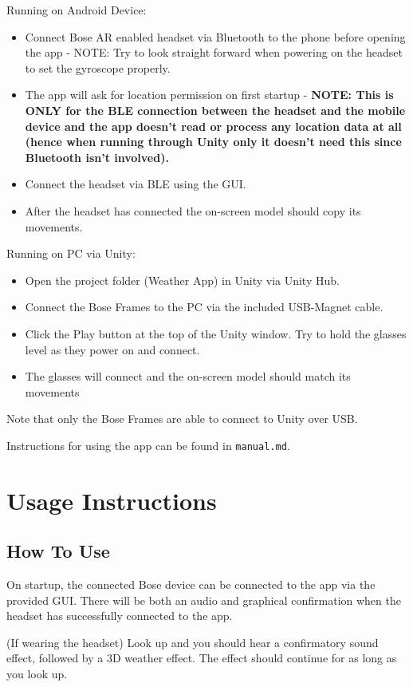 \documentclass{l4proj}
\begin{document}
\begin{appendices}
Running on Android Device: \begin{itemize}
    \item Connect Bose AR enabled headset via Bluetooth to the phone before opening the app - NOTE: Try to look straight forward when powering on the headset to set the gyroscope properly.
    \item The app will ask for location permission on first startup - \textbf{NOTE: This is ONLY for the BLE connection between the headset and the mobile device and the app doesn't read or process any location data at all (hence when running through Unity only it doesn't need this since Bluetooth isn't involved).}
    \item Connect the headset via BLE using the GUI.
    \item After the headset has connected the on-screen model should copy its movements.
\end{itemize}

Running on PC via Unity: \begin{itemize}
    \item Open the project folder (Weather App) in Unity via Unity Hub.
    \item Connect the Bose Frames to the PC via the included USB-Magnet cable.
    \item Click the Play button at the top of the Unity window. Try to hold the glasses level as they power on and connect.
    \item The glasses will connect and the on-screen model should match its movements
\end{itemize}

Note that only the Bose Frames are able to connect to Unity over USB.

Instructions for using the app can be found in \texttt{manual.md}.

\section{Usage Instructions}

\subsection{How To Use}
On startup, the connected Bose device can be connected to the app via the provided GUI. There will be both an audio and graphical confirmation when the headset has successfully connected to the app.

(If wearing the headset) Look up and you should hear a confirmatory sound effect, followed by a 3D weather effect. The effect should continue for as long as you look up.


\end{appendices}
\end{document}
